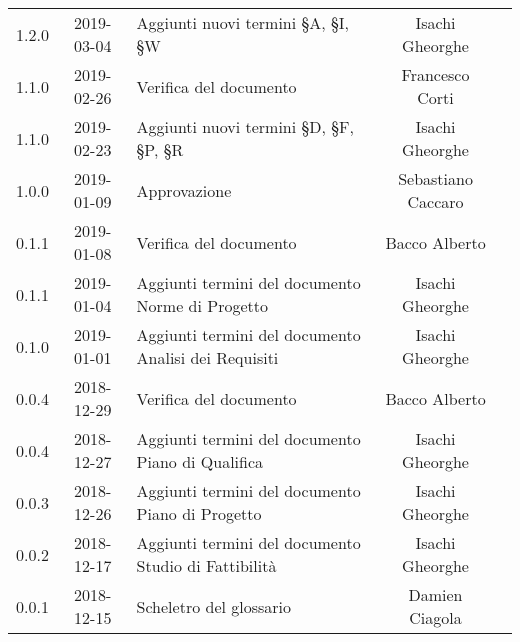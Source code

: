{\begin{longtable}{ c c  C{4cm}  c  c }
		1.2.0 & 2019-03-04 & Aggiunti nuovi termini \S{A}, \S{I}, \S{W} & Isachi Gheorghe &\reda{}\\
		
		1.1.0 & 2019-02-26 & Verifica del documento &  Francesco Corti & \ver{}\\
		
		1.1.0 & 2019-02-23 & Aggiunti nuovi termini  \S{D}, \S{F}, \S{P}, \S{R} & Isachi Gheorghe &\reda{}\\
		
		1.0.0 & 2019-01-09 & Approvazione & Sebastiano Caccaro & \Res{}\\
						
		0.1.1 & 2019-01-08 & Verifica del documento & Bacco Alberto & \ver{}\\
		
		0.1.1 & 2019-01-04 & Aggiunti termini del documento Norme di Progetto & Isachi Gheorghe &\reda{}\\
		
		0.1.0 & 2019-01-01 & Aggiunti termini del documento Analisi dei Requisiti & Isachi Gheorghe &\reda{}\\
		
		0.0.4 & 2018-12-29 & Verifica del documento & Bacco Alberto & \ver{}\\
				
		0.0.4 & 2018-12-27 & Aggiunti termini del documento Piano di Qualifica & Isachi Gheorghe &\reda{}\\
				
		0.0.3 & 2018-12-26 &Aggiunti termini del documento Piano di Progetto & Isachi Gheorghe & \reda{}\\
				
		0.0.2 & 2018-12-17 & Aggiunti termini del documento Studio di Fattibilità & Isachi Gheorghe &\reda{}\\
		
		0.0.1 & 2018-12-15 & Scheletro del glossario & Damien Ciagola & \reda{}\\
		
	\end{longtable}

}